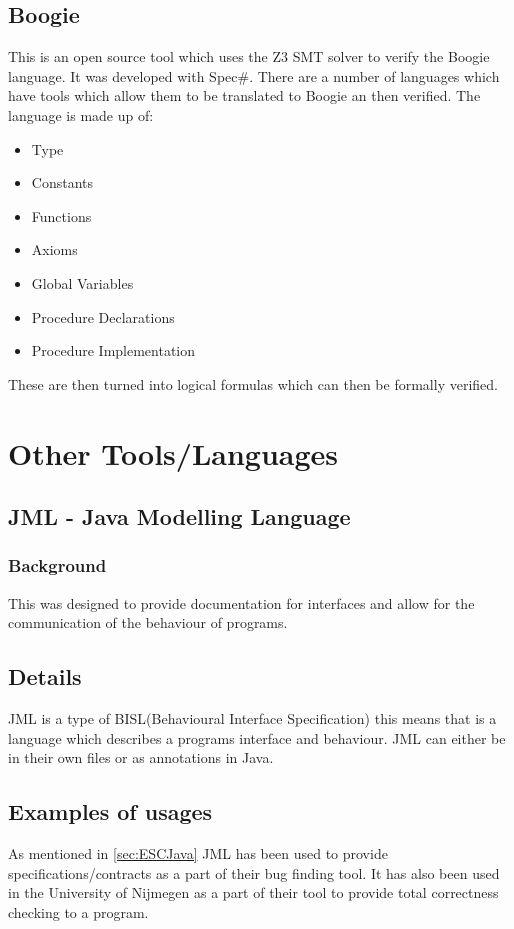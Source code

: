 \documentclass[a4paper,12pt]{scrartcl}
\begin{document}
{		\subsection{Boogie}
		{
			This is an open source tool which uses the Z3 SMT solver to verify the Boogie language. It was developed with Spec\#. There are a number of languages which have tools which allow them to be translated to Boogie an then verified. The language is made up of\cite{Leino2008a}:
			\begin{itemize}
				\item {Type}
				\item {Constants}
				\item {Functions}
				\item {Axioms}
				\item {Global Variables}
				\item {Procedure Declarations}
				\item {Procedure Implementation}
			\end{itemize}
			These are then turned into logical formulas which can then be formally verified.
		}
	}
	\section{Other Tools/Languages}
	{
		\subsection{JML - Java Modelling Language}
		{
			\subsubsection{Background}
			{
				This was designed to provide documentation for interfaces and allow for the communication of the behaviour of programs. 
			}
			\subsection{Details}
			{
				JML is a type of BISL(Behavioural Interface Specification) this means that is a language which describes a programs interface and behaviour. JML can either be in their own files or as annotations in Java\cite{Leavens2006}.
			}
			\subsection{Examples of usages}
			{
				As mentioned in \cref{sec:ESCJava} JML has been used to provide specifications/contracts as a part of their bug finding tool. It has also been used in the University of Nijmegen as a part of their tool to provide total correctness checking to a program\cite{Jacobs2001}.
			}
		}
	}
\end{document}
